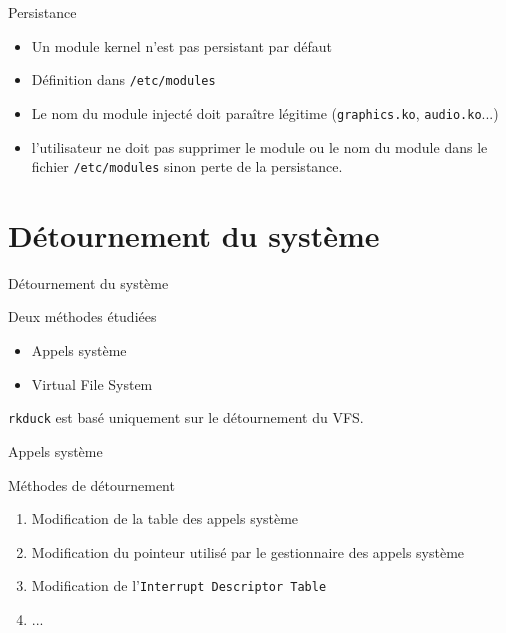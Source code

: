 \documentclass[10pt]{beamer}
\begin{document}
	\begin{frame}{Persistance}
		
		\begin{itemize}
			\item Un module kernel n'est pas persistant par défaut
			\item Définition dans \texttt{/etc/modules}
			\item Le nom du module injecté doit paraître légitime (\texttt{graphics.ko}, \texttt{audio.ko}...)
			\item \alert{l'utilisateur ne doit pas supprimer le module ou le nom du module dans le fichier \texttt{/etc/modules} sinon perte de la persistance.}
		\end{itemize}

		
		
	\end{frame}


\section{Détournement du système}

	
	\begin{frame}{Détournement du système}
		\begin{alertblock}{Deux méthodes étudiées}
	    \end{alertblock}
		\vspace{-0.60cm}
		\begin{itemize}
			\item Appels système
			\item Virtual File System
		\end{itemize}
		\alert{\texttt{rkduck} est basé uniquement sur le détournement du VFS.}
	\end{frame}

	\begin{frame}{Appels système}

		\begin{alertblock}{Méthodes de détournement}
		\begin{enumerate}
			\item Modification de la table des appels système
			\item Modification du pointeur utilisé par le gestionnaire des appels système
			\item Modification de l'\texttt{Interrupt Descriptor Table}
			\item ...
		\end{enumerate}
	    \end{alertblock}
	\end{frame}
\end{document}
